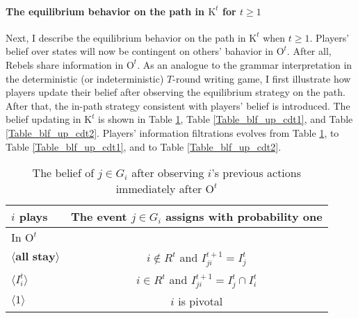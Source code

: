 \documentclass[12pt,letter]{article}
\newcommand{\Kappa}{\mathrm{K}}
\newcommand{\Omicron}{\mathrm{O}}
\theoremstyle{definition}
\theoremstyle{remark}
\theoremstyle{claim}
\begin{document}
\paragraph{The equilibrium behavior on the path in $\Kappa^t$ for $t\geq 1$}
Next, I describe the equilibrium behavior on the path in $\Kappa^t$ when $t\geq 1$. Players' belief over states will now be contingent on others' bahavior in $\Omicron^t$. After all, Rebels share information in $\Omicron^t$. As an analogue to the grammar interpretation in the deterministic (or indeterministic) $T$-round writing game, I first illustrate how players update their belief after observing the equilibrium strategy on the path. After that, the in-path strategy consistent with players' belief is introduced. The belief updating in $\Kappa^t$ is shown in Table \ref{Table_blf_up_rpt}, Table \ref{Table_blf_up_cdt1}, and Table \ref{Table_blf_up_cdt2}. Players' information filtrations evolves from Table \ref{Table_blf_up_rpt}, to Table \ref{Table_blf_up_cdt1}, and to Table \ref{Table_blf_up_cdt2}.

\begin{table}[!htbp]
\caption{The belief of $j\in G_i$ after observing $i$'s previous actions immediately after $\Omicron^t$ }
\label{Table_blf_up_rpt}
\begin{center}
\begin{tabular}{l | c}
 $i$ plays  		&	 The event $j\in G_i$ assigns with probability one \\
\hline
\hline
 In $\Omicron^t$		&					 \\
\hline
$\langle \textbf{all stay} \rangle$  &     $i\notin R^t$ and $I^{t+1}_{ji}=I^t_j$ \\
$\langle I^t_{i} \rangle$  &     $i\in R^t$ and $I^{t+1}_{ji}=I^t_j\cap I^t_{i}$ \\
$\langle 1 \rangle$  & 	  $i$ is pivotal    \\
  \hline
\end{tabular}
\end{center}
\end{table}
\end{document}
